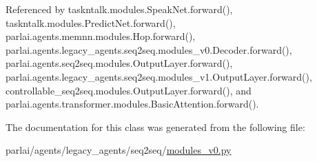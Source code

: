 Referenced by taskntalk.\+modules.\+Speak\+Net.\+forward(), taskntalk.\+modules.\+Predict\+Net.\+forward(), parlai.\+agents.\+memnn.\+modules.\+Hop.\+forward(), parlai.\+agents.\+legacy\+\_\+agents.\+seq2seq.\+modules\+\_\+v0.\+Decoder.\+forward(), parlai.\+agents.\+seq2seq.\+modules.\+Output\+Layer.\+forward(), parlai.\+agents.\+legacy\+\_\+agents.\+seq2seq.\+modules\+\_\+v1.\+Output\+Layer.\+forward(), controllable\+\_\+seq2seq.\+modules.\+Output\+Layer.\+forward(), and parlai.\+agents.\+transformer.\+modules.\+Basic\+Attention.\+forward().



The documentation for this class was generated from the following file\+:\begin{DoxyCompactItemize}
\item 
parlai/agents/legacy\+\_\+agents/seq2seq/\hyperlink{seq2seq_2modules__v0_8py}{modules\+\_\+v0.\+py}\end{DoxyCompactItemize}
